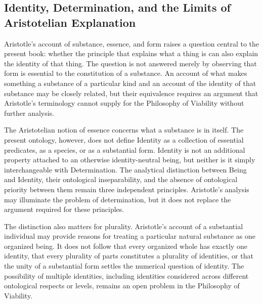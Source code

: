 


\subsection{Identity, Determination, and the Limits of Aristotelian Explanation}

\label{para:VS.B01.P01.C08.S05.SS09.P001}

Aristotle's account of substance, essence, and form
raises a question central to the present book:
whether the principle that explains what a thing
is can also explain the identity of that thing.
The question is not answered merely by observing
that form is essential to the constitution of
a substance. An account of what makes something
a substance of a particular kind and an account
of the identity of that substance may be closely
related, but their equivalence requires an argument
that Aristotle's terminology cannot supply for
the Philosophy of Viability without further analysis.

\label{para:VS.B01.P01.C08.S05.SS09.P002}

The Aristotelian notion of essence concerns what
a substance is in itself. The present ontology,
however, does not define Identity as a collection
of essential predicates, as a species, or as
a substantial form. Identity is not an additional
property attached to an otherwise identity-neutral
being, but neither is it simply interchangeable
with Determination. The analytical distinction
between Being and Identity, their ontological
inseparability, and the absence of ontological
priority between them remain three independent
principles. Aristotle's analysis may illuminate
the problem of determination, but it does not
replace the argument required for these principles.

\label{para:VS.B01.P01.C08.S05.SS09.P003}

The distinction also matters for plurality.
Aristotle's account of a substantial individual
may provide reasons for treating a particular
natural substance as one organized being.
It does not follow that every organized whole
has exactly one identity, that every plurality
of parts constitutes a plurality of identities,
or that the unity of a substantial form settles
the numerical question of identity. The possibility
of multiple identities, including identities
considered across different ontological respects
or levels, remains an open problem in the
Philosophy of Viability.

